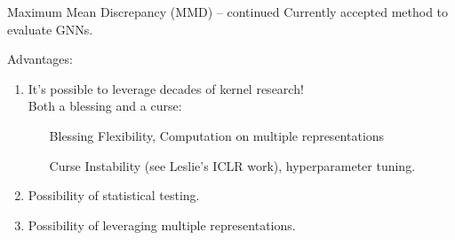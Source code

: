 \documentclass[aspectratio=169, 10pt, dvipsnames]{beamer}
\begin{document}
\begin{frame}[fragile]{Maximum Mean Discrepancy (MMD) -- continued}
  \pause\small Currently accepted method to evaluate GNNs.

  \pause Advantages:
  \begin{enumerate}
    \pause\item \small It's possible to leverage decades of kernel research!\\ Both a
    \textcolor{PineGreen}{blessing} and a \textcolor{YellowOrange}{curse}:
    \begin{itemize}
      \pause\item[\textcolor{PineGreen}{Blessing}] Flexibility, Computation on
      multiple representations
      \pause\item[\textcolor{YellowOrange}{Curse}] Instability (see Leslie's ICLR work), hyperparameter tuning.
    \end{itemize}
  \pause\item \small Possibility of statistical testing.
  \pause\item \small Possibility of leveraging multiple representations.
  \end{enumerate}
\end{frame}
\end{document}
